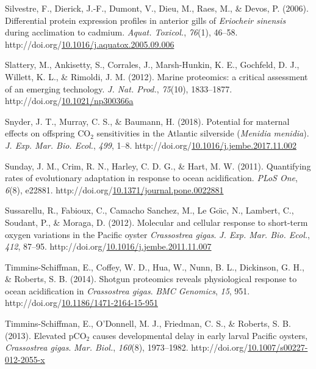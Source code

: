 \documentclass [11pt, proquest] {uwthesis}[2015/03/03]
\newlength{\cslhangindent}
\newenvironment{CSLReferences}%
{\setlength{\parindent}{0pt}%
\everypar{\setlength{\hangindent}{\cslhangindent}}\ignorespaces}%
{\par}
\begin{document}
\begin{CSLReferences}{1}{0}
\leavevmode\hypertarget{ref-Silvestre2006}{}%
Silvestre, F., Dierick, J.-F., Dumont, V., Dieu, M., Raes, M., \& Devos, P. (2006). {Differential protein expression profiles in anterior gills of \emph{Eriocheir sinensis} during acclimation to cadmium}. \emph{Aquat. Toxicol.}, \emph{76}(1), 46--58. http://doi.org/\href{https://doi.org/10.1016/j.aquatox.2005.09.006}{10.1016/j.aquatox.2005.09.006}

\leavevmode\hypertarget{ref-Slattery2012}{}%
Slattery, M., Ankisetty, S., Corrales, J., Marsh-Hunkin, K. E., Gochfeld, D. J., Willett, K. L., \& Rimoldi, J. M. (2012). {Marine proteomics: a critical assessment of an emerging technology}. \emph{J. Nat. Prod.}, \emph{75}(10), 1833--1877. http://doi.org/\href{https://doi.org/10.1021/np300366a}{10.1021/np300366a}

\leavevmode\hypertarget{ref-Snyder2018}{}%
Snyder, J. T., Murray, C. S., \& Baumann, H. (2018). {Potential for maternal effects on offspring {CO\(_2\)} sensitivities in the Atlantic silverside (\emph{Menidia menidia})}. \emph{J. Exp. Mar. Bio. Ecol.}, \emph{499}, 1--8. http://doi.org/\href{https://doi.org/10.1016/j.jembe.2017.11.002}{10.1016/j.jembe.2017.11.002}

\leavevmode\hypertarget{ref-Sunday2011}{}%
Sunday, J. M., Crim, R. N., Harley, C. D. G., \& Hart, M. W. (2011). {Quantifying rates of evolutionary adaptation in response to ocean acidification}. \emph{PLoS One}, \emph{6}(8), e22881. http://doi.org/\href{https://doi.org/10.1371/journal.pone.0022881}{10.1371/journal.pone.0022881}

\leavevmode\hypertarget{ref-Sussarellu2012}{}%
Sussarellu, R., Fabioux, C., Camacho Sanchez, M., Le Goı̈c, N., Lambert, C., Soudant, P., \& Moraga, D. (2012). {Molecular and cellular response to short-term oxygen variations in the Pacific oyster \emph{Crassostrea gigas}}. \emph{J. Exp. Mar. Bio. Ecol.}, \emph{412}, 87--95. http://doi.org/\href{https://doi.org/10.1016/j.jembe.2011.11.007}{10.1016/j.jembe.2011.11.007}

\leavevmode\hypertarget{ref-Timmins-Schiffman2014}{}%
Timmins-Schiffman, E., Coffey, W. D., Hua, W., Nunn, B. L., Dickinson, G. H., \& Roberts, S. B. (2014). {Shotgun proteomics reveals physiological response to ocean acidification in \emph{Crassostrea gigas}}. \emph{BMC Genomics}, \emph{15}, 951. http://doi.org/\href{https://doi.org/10.1186/1471-2164-15-951}{10.1186/1471-2164-15-951}

\leavevmode\hypertarget{ref-Timmins-Schiffman2013}{}%
Timmins-Schiffman, E., O'Donnell, M. J., Friedman, C. S., \& Roberts, S. B. (2013). {Elevated {pCO\(_2\)} causes developmental delay in early larval Pacific oysters, \emph{Crassostrea gigas}}. \emph{Mar. Biol.}, \emph{160}(8), 1973--1982. http://doi.org/\href{https://doi.org/10.1007/s00227-012-2055-x}{10.1007/s00227-012-2055-x}


\end{CSLReferences}
\end{document}
